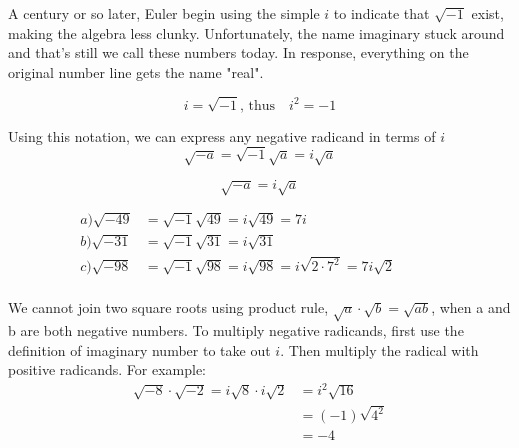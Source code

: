 \vspace{0.4cm}
A century or so later, Euler begin using the simple $i$ to indicate that $\sqrt{-1}$ exist,
making the algebra less clunky. Unfortunately, the name imaginary stuck around and that's still
we call these numbers today. In response, everything on the original number line gets the name
"real". 
	\begin{tcolorbox}[title={Imaginary unit $i$},fonttitle=\bfseries,
	colframe=blue!70!red,
	colback=white]
	\begin{equation}
	 i=\sqrt{-1},\,\text{thus} \quad i^2=-1 \label{img_num}
	\end{equation}
	\end{tcolorbox}
Using this notation, we can express any negative radicand in terms of $i$
\begin{equation*}
    \sqrt{-a}=\sqrt{-1}\sqrt{a}=i\sqrt{a} 
\end{equation*}
\begin{tcolorbox}[title=
                    Principle square root of a negative number,
                    fonttitle=\bfseries,
                    colframe=blue!70!red,
	                colback=white]
    \begin{equation}
            \sqrt{-a}=i\sqrt{a} 
             \label{break_i}
    \end{equation}
\end{tcolorbox}
\begin{exa}
 \begin{align*}
	a) \sqrt{-49} &=\sqrt{-1}\sqrt{49} =i\sqrt{49} = 7i &&&&\\
	b) \sqrt{-31} &=\sqrt{-1}\sqrt{31} =i\sqrt{31}&&&&\\
	c) \sqrt{-98} &=\sqrt{-1}\sqrt{98} =i\sqrt{98}=i\sqrt{2\cdot7^2}=7i\sqrt{2} &&&&\\
 \end{align*}
\end{exa}
\begin{nt}
	We cannot join two square roots using product rule, $\sqrt{a}\cdot \sqrt{b}=\sqrt{ab}$, when a and b are
	both negative numbers. To multiply negative radicands, first use the definition of imaginary
	number to take out $i$. Then multiply the radical with positive radicands. For example:
	\begin{align*}
	\sqrt{-8}\cdot\sqrt{-2}=i\sqrt{8}\cdot i\sqrt{2}&=i^2\sqrt{16}\\
	&=(-1)\sqrt{4^2}\\
	&=-4
	\end{align*}
\end{nt}
